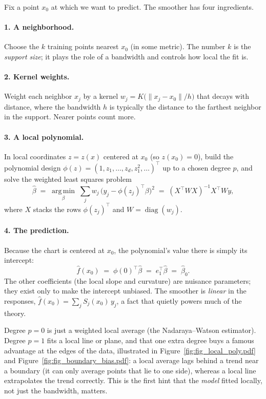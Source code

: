 \documentclass[11pt]{article}
\theoremstyle{definition}
\theoremstyle{remark}
\newcommand{\argmin}{\operatorname*{arg\,min}}
\begin{document}
Fix a point $x_0$ at which we want to predict. The smoother has four ingredients.

\paragraph{1. A neighborhood.} Choose the $k$ training points nearest $x_0$
(in some metric). The number $k$ is the \emph{support size}; it plays the role of
a bandwidth and controls how local the fit is.

\paragraph{2. Kernel weights.} Weight each neighbor $x_j$ by a kernel
$w_j = K\!\big(\|x_j - x_0\|/h\big)$ that decays with distance, where the
bandwidth $h$ is typically the distance to the farthest neighbor in the support.
Nearer points count more.

\paragraph{3. A local polynomial.} In local coordinates $z = z(x)$ centered at
$x_0$ (so $z(x_0) = 0$), build the polynomial design $\phi(z) = (1, z_1,\dots,
z_d, z_1^2,\dots)^\top$ up to a chosen degree $p$, and solve the weighted least
squares problem
\begin{equation}\label{eq:wls}
  \widehat\beta \;=\; \argmin_{\beta}\;
  \sum_{j} w_j\,\big(y_j - \phi(z_j)^\top \beta\big)^2
  \;=\; (X^\top W X)^{-1} X^\top W y,
\end{equation}
where $X$ stacks the rows $\phi(z_j)^\top$ and $W = \operatorname{diag}(w_j)$.

\paragraph{4. The prediction.} Because the chart is centered at $x_0$, the
polynomial's value there is simply its intercept:
\begin{equation}\label{eq:pred}
  \hat f(x_0) \;=\; \phi(0)^\top \widehat\beta \;=\; e_1^\top \widehat\beta
  \;=\; \widehat\beta_0 .
\end{equation}
The other coefficients (the local slope and curvature) are nuisance parameters;
they exist only to make the intercept unbiased. The smoother is \emph{linear} in
the responses, $\hat f(x_0) = \sum_j S_j(x_0)\, y_j$, a fact that quietly powers
much of the theory.

Degree $p=0$ is just a weighted local average (the Nadaraya--Watson estimator).
Degree $p=1$ fits a local line or plane, and that one extra degree buys a famous
advantage at the edges of the data, illustrated in Figure~\ref{fig:fig_local_poly.pdf}
and Figure~\ref{fig:fig_boundary_bias.pdf}: a local average lags behind a trend
near a boundary (it can only average points that lie to one side), whereas a local
line extrapolates the trend correctly. This is the first hint that the
\emph{model} fitted locally, not just the bandwidth, matters.
\end{document}
